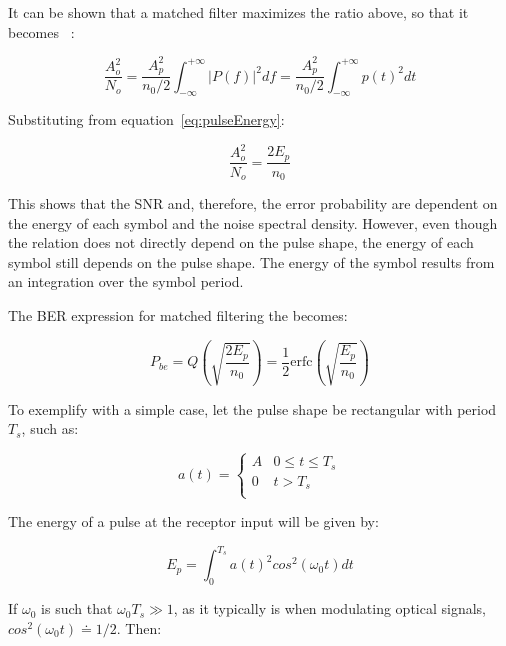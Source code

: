 \begin{refsection}
It can be shown that a matched filter maximizes the ratio above, so that it becomes~\cite{carlson1986communication} :

\begin{equation}
\frac{A_o^2}{N_o} = \frac{A_p^2}{n_0/2} \int_{-\infty}^{+\infty} |P(f)|^2 df = \frac{A_p^2}{n_0/2} \int_{-\infty}^{+\infty} p(t)^2 dt
\end{equation}

Substituting from equation~\ref{eq:pulseEnergy}:

\begin{equation}
\frac{A_o^2}{N_o} = \frac{2 E_p}{n_0}
\end{equation}

This shows that the SNR and, therefore, the error probability are dependent on the energy of each symbol and the noise spectral density. However, even though the relation does not directly depend on the pulse shape, the energy of each symbol still depends on the pulse shape. The energy of the symbol results from an integration over the symbol period.

The BER expression for matched filtering the becomes:

\begin{equation}\label{eq:berMQAMmf}
P_{be} =  Q\left(\sqrt{\frac{2 E_p}{{n_0}}}\right) = \frac{1}{2} \text{erfc}\left(\sqrt{\frac{E_p}{n_0}}\right) 
\end{equation}

To exemplify with a simple case, let the pulse shape be rectangular with period $T_s$, such as:

\begin{equation*}
	a(t) = \begin{cases}
		A               & 0 \le t \le T_s\\
		0               & t > T_s\\
	\end{cases}
\end{equation*}

The energy of a pulse at the receptor input will be given by:

\begin{equation}
E_p = \int_{0}^{T_s} {a(t)^2cos^2(\omega_0 t)} dt 
\end{equation}

If $\omega_0$ is such that $\omega_0 T_s \gg 1$, as it typically is when modulating optical signals, $cos^2(\omega_0 t) \doteq 1/2$. Then:


\end{refsection}
